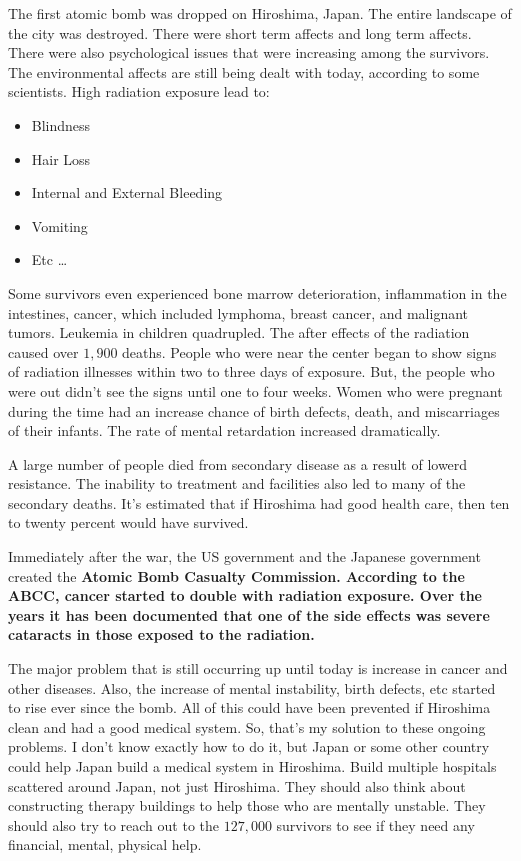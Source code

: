 The first atomic bomb was dropped on Hiroshima, Japan.
The entire landscape of the city was destroyed. There were short term affects
and long term affects. There were also psychological issues that were increasing
among the survivors. The environmental affects are still being dealt with today,
according to some scientists. High radiation exposure lead to:

\begin{itemize}
  \item Blindness
  \item Hair Loss
  \item Internal and External Bleeding
  \item Vomiting
  \item Etc \ldots
\end{itemize}

Some survivors even experienced bone marrow deterioration, inflammation in the
intestines, cancer, which included lymphoma, breast cancer, and malignant
tumors. Leukemia in children quadrupled. The after effects of the radiation
caused over $1,900$ deaths. People who were near the center began to show signs
of radiation illnesses within two to three days of exposure. But, the people who
were out didn't see the signs until one to four weeks. Women who were pregnant
during the time had an increase chance of birth defects, death, and
miscarriages of their infants. The rate of mental retardation increased
dramatically.

A large number of people died from secondary disease as a result of lowerd
resistance. The inability to treatment and facilities also led to many of the
secondary deaths. It's estimated that if Hiroshima had good health care, then
ten to twenty percent would have survived.

Immediately after the war, the US government and the Japanese government created
the \bf{Atomic Bomb Casualty Commission}. According to the \bf{ABCC}, cancer
started to double with radiation exposure. Over the years it has been documented
that one of the side effects was severe cataracts in those exposed to the
radiation.

The major problem that is still occurring up until today is increase in cancer
and other diseases. Also, the increase of mental instability, birth defects, etc
started to rise ever since the bomb. All of this could have been prevented if
Hiroshima clean and had a good medical system. So, that's my solution to these
ongoing problems. I don't know exactly how to do it, but Japan or some other
country could help Japan build a medical system in Hiroshima. Build multiple
hospitals scattered around Japan, not just Hiroshima. They should also think
about constructing therapy buildings to help those who are mentally unstable.
They should also try to reach out to the $127,000$ survivors to see if they need
any financial, mental, physical help.

